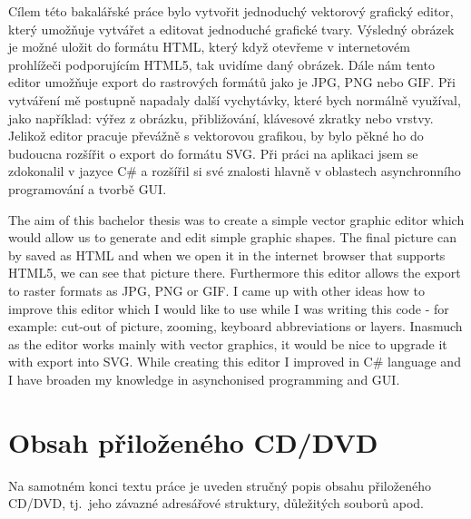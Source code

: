 \documentclass[
  field=inf,
  biblatex,
  glossaries,
  index
]{kidiplom}
\begin{document}
\begin{kiconclusions}
Cílem této bakalářské práce bylo vytvořit jednoduchý vektorový grafický editor, který umožňuje vytvářet a editovat jednoduché grafické tvary. Výsledný obrázek je možné uložit do formátu HTML, který když otevřeme v internetovém prohlížeči podporujícím HTML5, tak uvidíme daný obrázek. Dále nám tento editor umožňuje export do rastrových formátů jako je JPG, PNG nebo GIF. Při vytváření mě postupně napadaly další vychytávky, které bych normálně využíval, jako například: výřez z obrázku, přibližování, klávesové zkratky nebo vrstvy. Jelikož editor pracuje převážně s vektorovou grafikou, by bylo pěkné ho do budoucna rozšířit o export do formátu SVG. Při práci na aplikaci jsem se zdokonalil v jazyce C\# a rozšířil si své znalosti hlavně v oblastech asynchronního programování a tvorbě GUI.
\end{kiconclusions}

\begin{kiconclusions}[english]
The aim of this bachelor thesis was to create a simple vector graphic editor which would allow us to generate and edit simple graphic shapes. The final picture can by saved as HTML and when we open it in the internet browser that supports HTML5, we can see that picture there. Furthermore this editor allows the export to raster formats as JPG, PNG or GIF. I came up with other ideas how to improve this editor which I would like to use while I was writing this code - for example: cut-out of picture, zooming, keyboard abbreviations or layers. Inasmuch as the editor works mainly with vector graphics, it would be nice to upgrade it with export into SVG. While creating this editor I improved in C\# language and I have broaden my knowledge in asynchonised programming and GUI.
\end{kiconclusions}

\appendix

\section{Obsah přiloženého CD/DVD} \label{sec:ObsahCD}

Na samotném konci textu práce je uveden stručný popis obsahu
přiloženého CD/DVD, tj.~jeho závazné adresářové struktury, důležitých
souborů apod.
\end{document}
